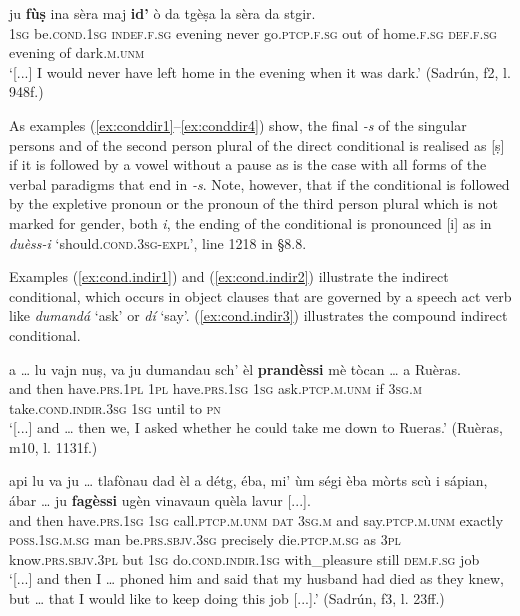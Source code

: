 \ea
\label{ex:conddir4}
\gll  [...] ju \textbf{fùṣ} ina sèra maj \textbf{id’} ò da tgèṣa la sèra da stgir. \\
{} \textsc{1sg} be.\textsc{cond.1sg} \textsc{indef.f.sg} evening never go.\textsc{ptcp.f.sg} out of home.\textsc{f.sg} \textsc{def.f.sg} evening of dark.\textsc{m.unm}\\
\glt `[...] I would never have left home in the evening when it was dark.' (Sadrún, f2, l. 948f.)
\z

As examples (\ref{ex:conddir1}--\ref{ex:conddir4}) show, the final \textit{-s} of the singular persons and of the second person plural of the direct conditional is realised as [ṣ] if it is followed by a vowel without a pause as is the case with all forms of the verbal paradigms that end in \textit{-s}. Note, however, that if the conditional is followed by the expletive pronoun or the pronoun of the third person plural which is not marked for gender, both \textit{i}, the ending of the conditional is pronounced [i] as in \textit{duèss-i} `should.\textsc{cond.3sg}-\textsc{expl}', line 1218 in §8.8.

Examples (\ref{ex:cond.indir1}) and (\ref{ex:cond.indir2}) illustrate the indirect conditional, which occurs in object clauses that are governed by a speech act verb like \textit{dumandá} `ask' or \textit{dí} `say'. (\ref{ex:cond.indir3}) illustrates the compound indirect conditional.

\ea
\label{ex:cond.indir1}
\gll  [...]  a … lu vajn nuṣ, va ju dumandau sch’ èl \textbf{prandèssi} mè tòcan … a Ruèras. \\
{} and {} then have.\textsc{prs.1pl} \textsc{1pl} have.\textsc{prs.1sg}  \textsc{1sg} ask.\textsc{ptcp.m.unm} if \textsc{3sg.m} take.\textsc{cond.indir.3sg} \textsc{1sg} until {} to \textsc{pn}\\
\glt `[...] and … then we, I asked whether he could take me down to Rueras.' (Ruèras, m10, l. 1131f.)
\z

\ea
\label{ex:cond.indir2}
\gll  [...] api lu va ju … tlafònau dad èl a détg, éba, mi' ùm ségi èba mòrts scù i sápian, ábar … ju \textbf{fagèssi} ugèn vinavaun quèla lavur [...].  \\
{} and then have.\textsc{prs.1sg} \textsc{1sg} {} call.\textsc{ptcp.m.unm} \textsc{dat} \textsc{3sg.m} and say.\textsc{ptcp.m.unm} exactly \textsc{poss.1sg.m.sg} man be.\textsc{prs.sbjv.3sg} precisely die.\textsc{ptcp.m.sg} as \textsc{3pl} know.\textsc{prs.sbjv.3pl} but {} \textsc{1sg} do.\textsc{cond.indir.1sg} with\_pleasure still \textsc{dem.f.sg} job\\ 
\glt `[...] and then I … phoned him and said that my husband had died as they knew, but … that I would like to keep doing this job [...].' (Sadrún, f3, l. 23ff.)
\z


